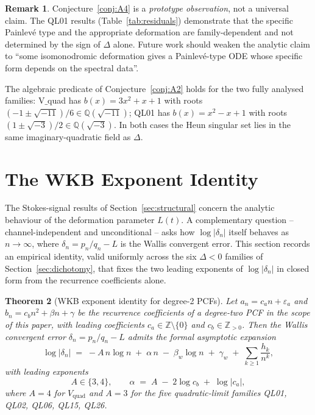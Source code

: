 \documentclass[12pt]{amsart}
\newtheorem{theorem}{Theorem}[section]
\theoremstyle{definition}
\newtheorem{remark}[theorem]{Remark}
\begin{document}
\begin{remark}\label{rem:prototype}
Conjecture~\ref{conj:A4} is a \emph{prototype observation}, not a universal
claim. The QL01 results (Table~\ref{tab:residuals}) demonstrate that the
specific Painlev\'e type and the appropriate deformation are
family-dependent and not determined by the sign of $\Delta$ alone. Future
work should weaken the analytic claim to ``some isomonodromic deformation
gives a Painlev\'e-type ODE whose specific form depends on the
spectral data''.
\end{remark}

The algebraic predicate of Conjecture~\ref{conj:A2} holds for the two
fully analysed families: V$\_$quad has $b(x)=3x^{2}+x+1$ with roots
$(-1\pm\sqrt{-11})/6\in\mathbb{Q}(\sqrt{-11})$; QL01 has $b(x)=x^{2}-x+1$
with roots $(1\pm\sqrt{-3})/2\in\mathbb{Q}(\sqrt{-3})$. In both cases the
Heun singular set lies in the same imaginary-quadratic field as $\Delta$.

\section{The WKB Exponent Identity}\label{sec:wkb}

The Stokes-signal results of Section~\ref{sec:structural} concern the
analytic behaviour of the deformation parameter $L(t)$.
A complementary question -- channel-independent and unconditional --
asks how $\log|\delta_{n}|$ itself behaves as $n\to\infty$, where
$\delta_{n}=p_{n}/q_{n}-L$ is the Wallis convergent error.
This section records an empirical identity, valid uniformly across the
six $\Delta<0$ families of Section~\ref{sec:dichotomy}, that fixes the
two leading exponents of $\log|\delta_{n}|$ in closed form from the
recurrence coefficients alone.

\begin{theorem}[WKB exponent identity for degree-2 PCFs]\label{thm:wkb}
Let $a_{n}=c_{a}n+\varepsilon_{a}$ and
$b_{n}=c_{b}n^{2}+\beta n+\gamma$ be the recurrence coefficients of
a degree-two PCF in the scope of this paper, with leading
coefficients $c_{a}\in\mathbb{Z}\setminus\{0\}$ and
$c_{b}\in\mathbb{Z}_{>0}$. Then the Wallis convergent error
$\delta_{n}=p_{n}/q_{n}-L$ admits the formal asymptotic expansion
\begin{equation}\label{eq:wkb}
\log|\delta_{n}| \;=\; -A\,n\log n \;+\; \alpha\,n
  \;-\; \beta_{w}\log n \;+\; \gamma_{w}
  \;+\; \sum_{k\ge 1}\frac{h_{k}}{n^{k}},
\end{equation}
with leading exponents
\begin{equation}\label{eq:wkb-alpha}
A\in\{3,4\},\qquad
\alpha \;=\; A \;-\; 2\log c_{b} \;+\; \log|c_{a}|,
\end{equation}
where $A=4$ for $V_{\mathrm{quad}}$ and $A=3$ for the five
quadratic-limit families QL01, QL02, QL06, QL15, QL26.
\end{theorem}
\end{document}
